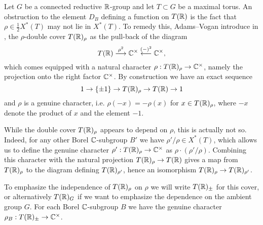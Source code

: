 \documentclass{article}
\theoremstyle{definition}
\numberwithin{equation}{section}
\renewcommand{\-}{\hyp{}}
\begin{document}
Let $G$ be a connected reductive $\mathbb{R}$-group and let $T \subset G$ be a maximal torus. An obstruction to the element $D_B$ defining a function on $T(\mathbb{R})$ is the fact that $\rho \in \frac{1}{2}X^*(T)$ may not lie in $X^*(T)$. To remedy this, Adams--Vogan introduce in \cite{AV92}, \cite{AV16} the $\rho$-double cover $T(\mathbb{R})_\rho$ as the pull-back of the diagram
\[ T(\mathbb{R})\stackrel{\rho^2}{\longrightarrow} \mathbb{C}^\times \stackrel{(-)^2}{\longleftarrow} \mathbb{C}^\times, \]
which comes equipped with a natural character $\rho : T(\mathbb{R})_\rho \to \mathbb{C}^\times$, namely the projection onto the right factor $\mathbb{C}^\times$. By construction we have an exact sequence
\[ 1 \to \{\pm 1\} \to T(\mathbb{R})_\rho \to T(\mathbb{R}) \to 1 \]
and $\rho$ is a genuine character, i.e. $\rho(-x)=-\rho(x)$ for $x \in T(\mathbb{R})_\rho$, where $-x$ denote the product of $x$ and the element $-1$.

While the double cover $T(\mathbb{R})_\rho$ appears to depend on $\rho$, this is actually not so. Indeed, for any other Borel $\mathbb{C}$-subgroup $B'$ we have $\rho'/\rho \in X^*(T)$, which allows us to define the genuine character $\rho' : T(\mathbb{R})_\rho \to \mathbb{C}^\times$ as $\rho \cdot (\rho'/\rho)$. Combining this character with the natural projection $T(\mathbb{R})_\rho \to T(\mathbb{R})$ gives a map from $T(\mathbb{R})_\rho$ to the diagram defining $T(\mathbb{R})_{\rho'}$, hence an isomorphism $T(\mathbb{R})_\rho \to T(\mathbb{R})_{\rho'}$.

To emphasize the independence of $T(\mathbb{R})_\rho$ on $\rho$ we will write $T(\mathbb{R})_\pm$ for this cover, or alternatively $T(\mathbb{R})_G$ if we want to emphasize the dependence on the ambient group $G$. For each Borel $\mathbb{C}$-subgroup $B$ we have the genuine character $\rho_B : T(\mathbb{R})_\pm \to \mathbb{C}^\times$.
\end{document}
